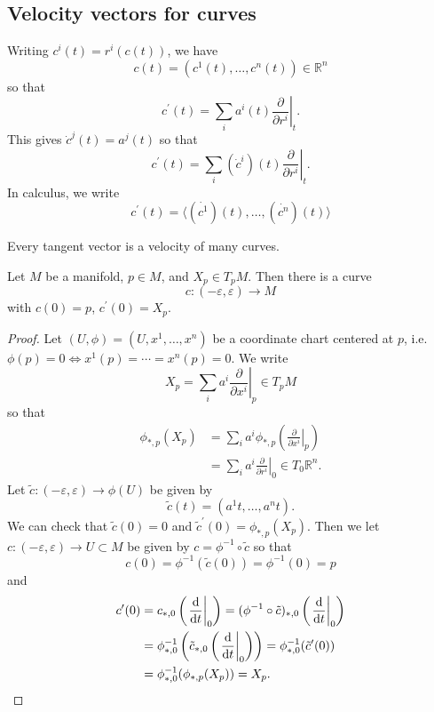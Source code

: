 \subsection{Velocity vectors for curves}
Writing $c^i(t) = r^i(c(t))$, we have
$$
  c(t)
= (c^1(t), \dots, c^n(t)) \in \mathbb{R}^n
$$
so that
$$
  c^\prime(t)
= \sum_i
    a^i(t)
    \left.\frac{\partial}{\partial r^i}\right|_t.
$$
This gives $\dot{c}^j(t) = a^j(t)$ so that
$$
  c^\prime(t)
= \sum_i
    (\dot{c}^i)(t)
    \left.\frac{\partial}{\partial r^i}\right|_t.
$$
In calculus, we write
$$
  c^\prime(t)
= \langle
    (\dot{c^1})(t), \dots, (\dot{c^n})(t)
  \rangle
$$

Every tangent vector is a velocity of many curves.
\begin{lemma}
Let $M$ be a manifold, $p \in M$, and $X_p \in T_pM$.
Then there is a curve
$$
c: (-\varepsilon, \varepsilon) \to M
$$
with $c(0) = p$, $c^\prime(0) = X_p$.
\end{lemma}

\begin{proof}
Let $(U, \phi) = (U, x^1, \dots, x^n)$ be a coordinate chart centered
at $p$, i.e. $\phi(p) = 0 \iff x^1(p) = \cdots = x^n(p) = 0$. We write
$$
  X_p
= \sum_i
    a^i \left.\frac{\partial}{\partial x^i}\right|_p
\in T_p M
$$
so that
\begin{align*}
   \phi_{\ast, p}(X_p)
&= \sum_i
     a^i \phi_{\ast, p}
     \left(
       \left.\frac{\partial}{\partial x^i}\right|_p
     \right) \\
&= \sum_i
     a^i
     \left.\frac{\partial}{\partial r^i}\right|_0
\in T_0 \mathbb{R}^n.
\end{align*}
Let $\tilde{c} : (-\varepsilon, \varepsilon) \to \phi(U)$ be given by
$$
  \tilde{c}(t)
= (a^1 t, \dots, a^n t).
$$
We can check that $\tilde{c}(0) = 0$ and
$\tilde{c}^\prime(0) = \phi_{\ast, p}(X_p)$.
Then we let
$c : (-\varepsilon, \varepsilon) \to U \subset M$ be given by
$c = \phi^{-1} \circ \tilde{c}$ so that
$$
  c(0)
= \phi^{-1}(\tilde{c}(0))
= \phi^{-1}(0)
= p
$$
and
\begin{align*}
   c^\prime(0)
&= c_{\ast,0}
     \left(
       \left.\frac{\mathop{}\!\mathrm{d}}{\mathop{}\!\mathrm{d} t}\right|_0
     \right)
 = (\phi^{-1} \circ \tilde{c})_{\ast, 0}
     \left(
       \left.\frac{\mathop{}\!\mathrm{d}}{\mathop{}\!\mathrm{d} t}\right|_0
     \right) \\
&= \phi^{-1}_{\ast, 0}
     \left(
       \tilde{c}_{\ast, 0}
       \left(
         \left.\frac{\mathop{}\!\mathrm{d}}{\mathop{}\!\mathrm{d} t}\right|_0
       \right)
     \right)
 = \phi^{-1}_{\ast, 0}(\tilde{c}^\prime(0)) \\
&= \phi^{-1}_{\ast, 0}(\phi_{\ast,p}(X_p))
 = X_p.
\end{align*}
\end{proof}

